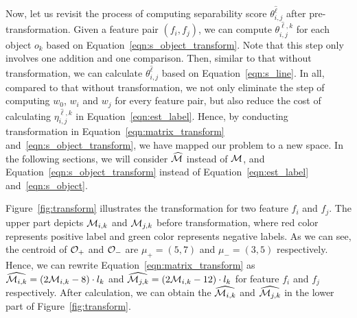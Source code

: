 
Now, let us revisit the process of computing separability score $\theta_{i,j}^{\hat{\ell}}$ after pre-transformation. Given a feature pair $(f_i,f_j)$, we can compute $\theta_{i,j}^{\hat{\ell},k}$ for each object $o_k$ based on Equation~\ref{eqn:s_object_transform}. Note that this step only involves one addition and one comparison. Then, similar to that without transformation, we can calculate $\theta_{i,j}^{\hat{\ell}}$ based on Equation~\ref{eqn:s_line}. In all, compared to that without transformation, we not only eliminate the step of computing $w_0$, $w_i$ and $w_j$ for every feature pair, but also reduce the cost of calculating $\eta_{i,j}^{\hat{\ell},k}$ in Equation~\ref{eqn:est_label}. Hence, by conducting transformation in Equation~\ref{eqn:matrix_transform} and~\ref{eqn:s_object_transform}, we have mapped our problem to a new space. In the following sections, we will consider $\widehat{\mm}$ instead of $\mm$, and Equation~\ref{eqn:s_object_transform} instead of Equation~\ref{eqn:est_label} and~\ref{eqn:s_object}.


\begin{example}[Transformation]
Figure~\ref{fig:transform} illustrates the transformation for two feature $f_i$ and $f_j$. The upper part depicts $\mm_{i,k}$ and $\mm_{j,k}$ before transformation, where red color represents positive label and green color represents negative labels. As we can see, the centroid of $\oo_+$ and $\oo_-$ are $\mu_+=(5,7)$ and $\mu_-=(3,5)$ respectively. Hence, we can rewrite Equation~\ref{eqn:matrix_transform} as $\widehat{\mm_{i,k}} = (2\mm_{i,k}-8)\cdot l_k$ and $\widehat{\mm_{j,k}} = (2\mm_{i,k}-12)\cdot l_k$ for feature $f_i$ and $f_j$ respectively. After calculation, we can obtain the $\widehat{\mm_{i,k}}$ and $\widehat{\mm_{j,k}}$ in the lower part of Figure~\ref{fig:transform}.
\end{example}

